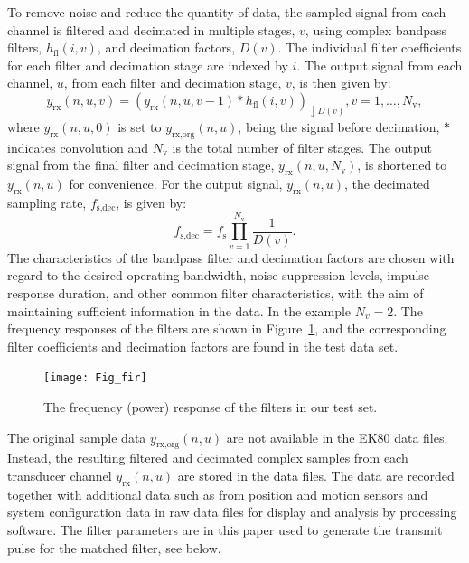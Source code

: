 \documentclass[preprint,12pt,TurnOnLineNumbers]{JASAnew}
\newcommand{\samplesymt}{n}
\newcommand{\genidxsym}{i}
\newcommand{\channelsym}{u}
\newcommand{\stagesym}{v}
\newcommand{\nstages}{N_{\textrm{v}}}
\newcommand{\fs}{f_{\textrm{s}}}
\newcommand{\fsdec}{f_{\textrm{s,dec}}}
\newcommand{\yrx}{y_{\textrm{rx}}}
\newcommand{\yrxorg}{y_{\textrm{rx,org}}}
\newcommand{\decfac}{D}
\newcommand{\hfl}{h_{\textrm{fl}}}
\begin{document}
To remove noise and reduce the quantity of data, the sampled signal from each channel is filtered and decimated in multiple stages, $\stagesym$, using complex bandpass filters, $\hfl(\genidxsym,\stagesym)$, and decimation factors, $\decfac(\stagesym)$. The individual filter coefficients for each filter and decimation stage are indexed by $i$. The output signal from each channel, $\channelsym$, from each filter and decimation stage, $\stagesym$, is then given by:
%
\begin{equation}
\label{eq:yrx}
\yrx(\samplesymt,\channelsym,\stagesym) = \left( \yrx(\samplesymt,\channelsym,\stagesym-1) * \hfl(\genidxsym,\stagesym) \right)_{\downarrow \decfac(\stagesym)}, 
\stagesym = 1,\ldots,\nstages,
\end{equation}
%
where $\yrx(\samplesymt,\channelsym,0)$ is set to $\yrxorg(\samplesymt,\channelsym)$, being the signal before decimation, $*$ indicates convolution and $\nstages$ is the total number of filter stages. The output signal from the final filter and decimation stage, $\yrx(\samplesymt,\channelsym,\nstages)$, is shortened to $\yrx(\samplesymt,\channelsym)$ for convenience. For the output signal, $\yrx(\samplesymt,\channelsym)$, the decimated sampling rate, $\fsdec$, is given by:
%
\begin{equation}
\label{eq:fsdec}
\fsdec = \fs\prod_{\stagesym=1}^{\nstages} \frac{1}{\decfac(\stagesym)}.
\end{equation}
%
The characteristics of the bandpass filter and decimation factors are chosen with regard to the desired operating bandwidth, noise suppression levels, impulse response duration, and other common filter characteristics, with the aim of maintaining sufficient information in the data. In the example $N_v=2$. The frequency responses of the filters are shown in Figure~\ref{fi:fir}, and the corresponding filter coefficients and decimation factors are found in the test data set.

\begin{figure}
\texttt{[image: Fig\_fir]}
\caption{\label{fi:fir} The frequency (power) response of the filters in our test set.}
\end{figure}

The original sample data $\yrxorg(\samplesymt,\channelsym)$ are not available in the EK80 data files. Instead, the resulting filtered and decimated complex samples from each transducer channel $\yrx(\samplesymt,\channelsym)$ are stored in the data files. The data are recorded together with additional data such as from position and motion sensors and system configuration data in raw data files for display and analysis by processing software. The filter parameters are in this paper used to generate the transmit pulse for the matched filter, see below.
\end{document}
